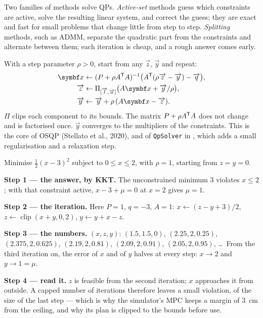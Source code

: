 Two families of methods solve QPs. \emph{Active-set} methods guess which constraints are active, solve the resulting linear system, and correct the guess; they are exact and fast for small problems that change little from step to step. \emph{Splitting} methods, such as ADMM, separate the quadratic part from the constraints and alternate between them; each iteration is cheap, and a rough answer comes early.

\begin{result}
With a step parameter $\rho > 0$, start from any $\vec z$, $\vec y$ and repeat:
\begin{align}
  \vx &\leftarrow (P + \rho A^\T A)^{-1}\big(A^\T(\rho\vec z - \vec y) - \vec q\big), \label{eq:J-admm-x}\\
  \vec z &\leftarrow \Pi_{[\vec l, \vec u]}\big(A\vx + \vec y/\rho\big), \label{eq:J-admm-z}\\
  \vec y &\leftarrow \vec y + \rho\,(A\vx - \vec z) . \label{eq:J-admm-y}
\end{align}
$\Pi$ clips each component to its bounds. The matrix $P + \rho A^{\mathsf{T}} A$ does not change and is factorised once. $\vec y$ converges to the multipliers of the constraints. This is the core of OSQP (Stellato et al., 2020), and of \texttt{QpSolver} in , which adds a small regularisation and a relaxation step.
\end{result}

\begin{example}
\label{ex:J-admm}
Minimise $\tfrac12(x - 3)^2$ subject to $0 \le x \le 2$, with $\rho = 1$, starting from $z = y = 0$.

\textbf{Step 1 — the answer, by KKT.} The unconstrained minimum 3 violates $x \le 2$; with that constraint active, $x - 3 + \mu = 0$ at $x = 2$ gives $\mu = 1$.

\textbf{Step 2 — the iteration.} Here $P = 1$, $q = -3$, $A = 1$: $x \leftarrow (z - y + 3)/2$, $z \leftarrow \operatorname{clip}(x + y, 0, 2)$, $y \leftarrow y + x - z$.

\textbf{Step 3 — the numbers.} $(x, z, y)$: $(1.5, 1.5, 0)$, $(2.25, 2, 0.25)$, $(2.375, 2, 0.625)$, $(2.19, 2, 0.81)$, $(2.09, 2, 0.91)$, $(2.05, 2, 0.95)$, \dots\ From the third iteration on, the error of $x$ and of $y$ halves at every step: $x \to 2$ and $y \to 1 = \mu$.

\textbf{Step 4 — read it.} $z$ is feasible from the second iteration; $x$ approaches it from outside. A capped number of iterations therefore leaves a small violation, of the size of the last step — which is why the simulator's MPC keeps a margin of \SI{3}{cm} from the ceiling, and why its plan is clipped to the bounds before use.
\end{example}

